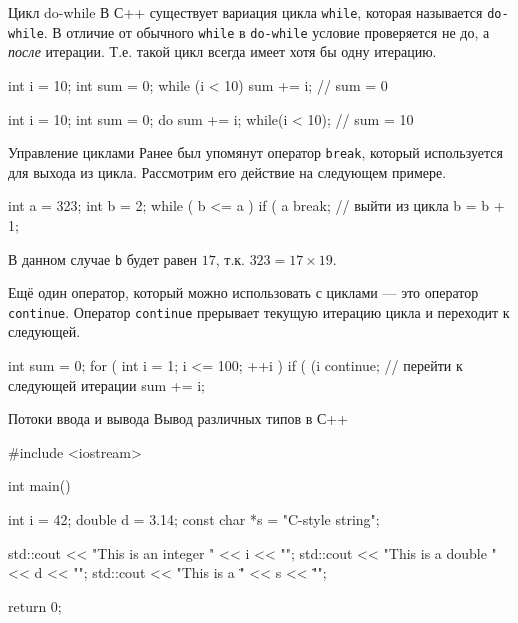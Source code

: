 \documentclass[
    9pt,
    hyperref={pdfencoding=unicode}
    ]{beamer}
\begin{document}
\begin{frame}[fragile]{Цикл do-while}
    В С++ существует вариация цикла \texttt{while}, которая называется \texttt{do-while}. В отличие от обычного \texttt{while} в \texttt{do-while} условие проверяется не до, а \emph{после} итерации. Т.е. такой цикл всегда имеет хотя бы одну итерацию.
    
    \begin{cppcode}
        int i = 10;
        int sum = 0;
        while (i < 10) {
            sum += i;
        }
        // sum = 0
    \end{cppcode}
    
    \vspace{1em}
    \begin{cppcode}
        int i = 10;
        int sum = 0;
        do {
            sum += i;
        } while(i < 10);
        // sum = 10
    \end{cppcode}
\end{frame}

\begin{frame}[fragile]{Управление циклами}
    Ранее был упомянут оператор \texttt{break}, который используется для выхода из цикла. Рассмотрим его действие на следующем примере.
    \begin{cppcode}
        int a = 323;
        int b = 2;
        while ( b <= a ) { 
            if ( a %
            break; // выйти из цикла
            b = b + 1;
        }
    \end{cppcode}
    
    В данном случае \texttt{b} будет равен $ 17 $, т.к. $ 323 = 17 \times 19 $.
    
    \vspace{1em}
    Ещё один оператор, который можно использовать с циклами — это оператор \texttt{continue}. Оператор \texttt{continue} прерывает текущую итерацию цикла и переходит к следующей.
    \begin{cppcode}
        int sum = 0;
        for ( int i = 1; i <= 100; ++i ) {
            if ( (i %
            continue; // перейти к следующей итерации
            sum += i;
        }
    \end{cppcode}
\end{frame}

\begin{frame}[fragile]{Потоки ввода и вывода}
        Вывод различных типов в С++
        \begin{cppcode}
            #include <iostream>
            
            int main()
            {
                int i = 42;
                double d = 3.14;
                const char *s = "C-style string";
                
                std::cout << "This is an integer " << i << "\n";
                std::cout << "This is a double " << d << "\n";
                std::cout << "This is a \"" << s << "\"\n";
                
                return 0;
            }
        \end{cppcode}
    
\end{frame}
\end{document}
